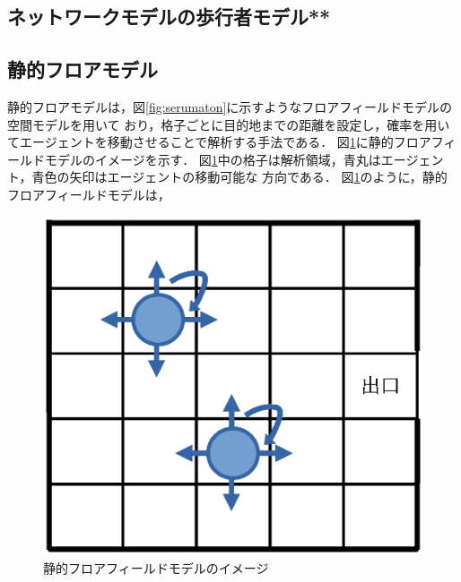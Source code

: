 \subsection{ネットワークモデルの歩行者モデル**}

\subsection{静的フロアモデル}
静的フロアモデルは，図\ref{fig:serumaton}に示すようなフロアフィールドモデルの空間モデルを用いて
おり，格子ごとに目的地までの距離を設定し，確率を用いてエージェントを移動させることで解析する手法である．
図\ref{fig:huroa_model_image}に静的フロアフィールドモデルのイメージを示す．
図\ref{fig:huroa_model_image}中の格子は解析領域，青丸はエージェント，青色の矢印はエージェントの移動可能な
方向である．
図\ref{fig:huroa_model_image}のように，静的フロアフィールドモデルは，

\begin{figure}[h]
    \begin{center}
     \includegraphics[width=14cm,clip]{figure/floormodel_image.eps}
     \caption{静的フロアフィールドモデルのイメージ}
     \label{fig:huroa_model_image}
    \end{center}
\end{figure}


